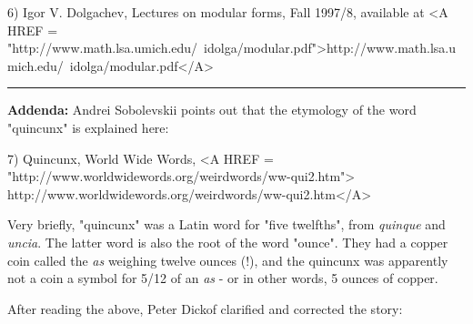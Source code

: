 6) Igor V. Dolgachev, Lectures on modular forms, Fall 1997/8,
available at <A HREF = "http://www.math.lsa.umich.edu/~idolga/modular.pdf">http://www.math.lsa.umich.edu/~idolga/modular.pdf</A>

\par\noindent\rule{\textwidth}{0.4pt}
\textbf{Addenda:}  Andrei Sobolevskii points out that the
etymology of the word "quincunx" is explained here:

7) Quincunx, World Wide Words,
<A HREF = "http://www.worldwidewords.org/weirdwords/ww-qui2.htm">
http://www.worldwidewords.org/weirdwords/ww-qui2.htm</A>

Very briefly, "quincunx" was a Latin word for
"five twelfths", from \emph{quinque} and \emph{uncia}.
The latter word is also the root of the word "ounce".
They had a copper coin called the \emph{as} weighing twelve
ounces (!), and the quincunx was apparently not a coin
a symbol for 5/12 of an \emph{as} - or in other words, 5 ounces
of copper.

After reading the above, Peter Dickof clarified and corrected 
the story: 

